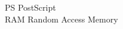 \begin{tabbing}


    \>PS \>\>PostScript\\














    \>RAM \>\>Random Access Memory\\







\end{tabbing}
